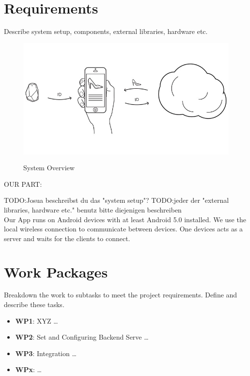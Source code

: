 \documentclass{report}
\newcommand{\lfig}[1]{\label{fig:#1}}
\begin{document}
\section{Requirements}
Describe system setup, components, external libraries, hardware etc.


\begin{figure}[h]
	\centering
    \includegraphics[width=\columnwidth]{overview.jpg}
    \lfig{system-overview}
    \vspace{-5mm} %
	\caption{System Overview~\cite{estimote}}
\end{figure}

OUR PART:

TODO:Josua beschreibst du das "system setup"?
TODO:jeder der "external libraries, hardware etc." benutz bitte diejenigen beschreiben
\\
Our App runs on Android devices with at least Android 5.0 installed. We use the local wireless connection to communicate between devices. One devices acts as a server and waits for the clients to connect. 

\section{Work Packages}
Breakdown the work to subtasks to meet the project requirements.
Define and describe these tasks.

\begin{itemize}
        \item {\bf WP1}:  XYZ  \ldots    
        \item {\bf WP2}: Set and Configuring Backend Serve  \ldots    
        \item {\bf WP3}: Integration  \ldots 
         \item {\bf WPx}:  \ldots 
\end{itemize}
 
\end{document}
